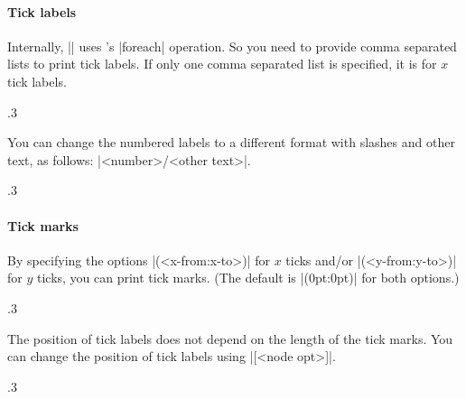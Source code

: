 \paragraph{Tick labels}
Internally, |\tzticks| uses \Tikz's |foreach| operation.
So you need to provide comma separated lists to print tick labels.
If only one comma separated list is specified, it is for $x$ tick labels.

\begin{tzcode}{.3}
{}
\end{tzcode}

You can change the numbered labels to a different format with slashes and other text, as follows: |<number>/<other text>|.

\begin{tzcode}{.3}
\end{tzcode}

\paragraph{Tick marks}
By specifying the options |(<x-from:x-to>)| for $x$ ticks and/or |(<y-from:y-to>)| for $y$ ticks, you can print tick marks. (The default is |(0pt:0pt)| for both options.)

\begin{tzcode}{.3}
\end{tzcode}

The position of tick labels does not depend on the length of the tick marks.
You can change the position of tick labels using |[<node opt>]|.

\begin{tzcode}{.3}
\end{tzcode}

